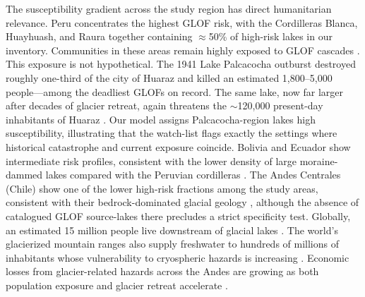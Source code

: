 \documentclass[pdflatex,sn-basic]{sn-jnl}%
\begin{document}
The susceptibility gradient across the study region has direct
humanitarian relevance. Peru concentrates the highest GLOF risk, with
the Cordilleras Blanca, Huayhuash, and Raura together containing $\approx$50\%
of high-risk lakes in our inventory. Communities in these areas remain
highly exposed to GLOF cascades
\citep{Hegglin2008,Carey2012,Bury2011,Motschmann2020}.
This exposure is not hypothetical. The 1941 Lake Palcacocha outburst
destroyed roughly one-third of the city of Huaraz and killed an
estimated 1{,}800--5{,}000 people---among the deadliest GLOFs on record.
The same lake, now far larger after decades of glacier retreat, again
threatens the $\sim$120{,}000 present-day inhabitants of Huaraz
\citep{Carey2010,Vilimek2005,Somos-Valenzuela2016}. Our model
assigns Palcacocha-region lakes high susceptibility, illustrating that
the watch-list flags exactly the settings where historical
catastrophe and current exposure coincide.
Bolivia and Ecuador show intermediate risk profiles, consistent with
the lower density of large moraine-dammed lakes compared with the
Peruvian cordilleras \citep{Francou2003,Caceres2010}. The Andes
Centrales (Chile) show one of the lower high-risk fractions among the
study areas, consistent with their bedrock-dominated glacial geology
\citep{IribarrenAnacona2014,Masiokas2020}, although the absence of
catalogued GLOF source-lakes there precludes a strict specificity test. Globally, an estimated 15
million people live downstream of glacial lakes \citep{Taylor2023}. The
world's glacierized mountain ranges also supply freshwater to hundreds
of millions of inhabitants whose vulnerability to cryospheric hazards is
increasing \citep{Immerzeel2010,Immerzeel2020,Huss2018}.
Economic losses from glacier-related hazards across the Andes are
growing as both population exposure and glacier retreat accelerate
\citep{Vergara2007,Hock2019}.
\end{document}
